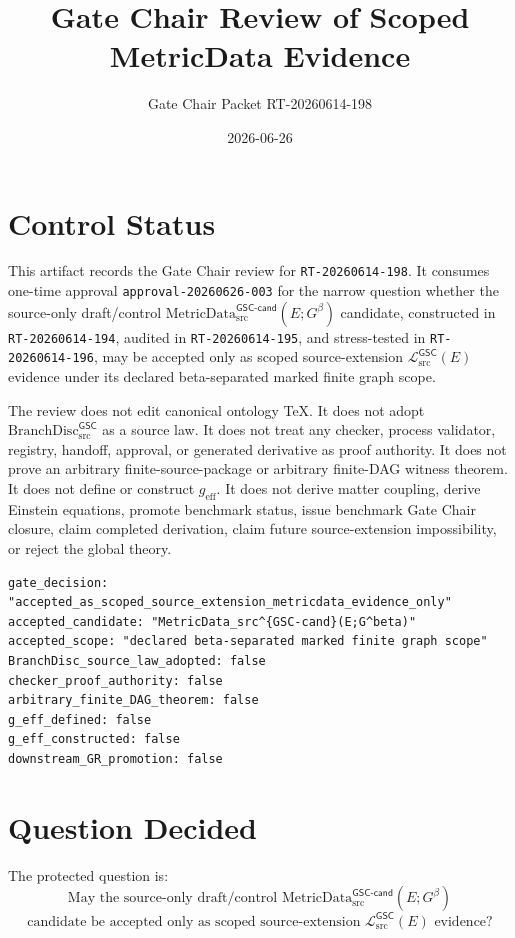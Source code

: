 \documentclass[11pt]{article}
\title{Gate Chair Review of Scoped MetricData Evidence}
\author{Gate Chair Packet RT-20260614-198}
\date{2026-06-26}
\newcommand{\BranchDisc}{\mathrm{BranchDisc}_{\mathrm{src}}^{\mathsf{GSC}}}
\newcommand{\MetricDataCand}{\mathrm{MetricData}_{\mathrm{src}}^{\mathsf{GSC\mbox{-}cand}}}
\newcommand{\MetricData}{\mathcal{L}_{\mathrm{src}}^{\mathsf{GSC}}}
\newcommand{\Gbeta}{G^{\beta}}
\newcommand{\geff}{g_{\mathrm{eff}}}
\begin{document}
\maketitle

\section{Control Status}

This artifact records the Gate Chair review for \texttt{RT-20260614-198}. It
consumes one-time approval \texttt{approval-20260626-003} for the narrow
question whether the source-only draft/control
\(\MetricDataCand(E;\Gbeta)\) candidate, constructed in
\texttt{RT-20260614-194}, audited in \texttt{RT-20260614-195}, and
stress-tested in \texttt{RT-20260614-196}, may be accepted only as scoped
source-extension \(\MetricData(E)\) evidence under its declared
beta-separated marked finite graph scope.

The review does not edit canonical ontology TeX. It does not adopt
\(\BranchDisc\) as a source law. It does not treat any checker, process
validator, registry, handoff, approval, or generated derivative as proof
authority. It does not prove an arbitrary finite-source-package or arbitrary
finite-DAG witness theorem. It does not define or construct \(\geff\). It
does not derive matter coupling, derive Einstein equations, promote benchmark
status, issue benchmark Gate Chair closure, claim completed derivation, claim
future source-extension impossibility, or reject the global theory.

\begin{verbatim}
gate_decision: "accepted_as_scoped_source_extension_metricdata_evidence_only"
accepted_candidate: "MetricData_src^{GSC-cand}(E;G^beta)"
accepted_scope: "declared beta-separated marked finite graph scope"
BranchDisc_source_law_adopted: false
checker_proof_authority: false
arbitrary_finite_DAG_theorem: false
g_eff_defined: false
g_eff_constructed: false
downstream_GR_promotion: false
\end{verbatim}

\section{Question Decided}

The protected question is:
\[
\text{May the source-only draft/control }\MetricDataCand(E;\Gbeta)
\]
\[
\text{candidate be accepted only as scoped source-extension }
\MetricData(E)\text{ evidence?}
\]
\end{document}
